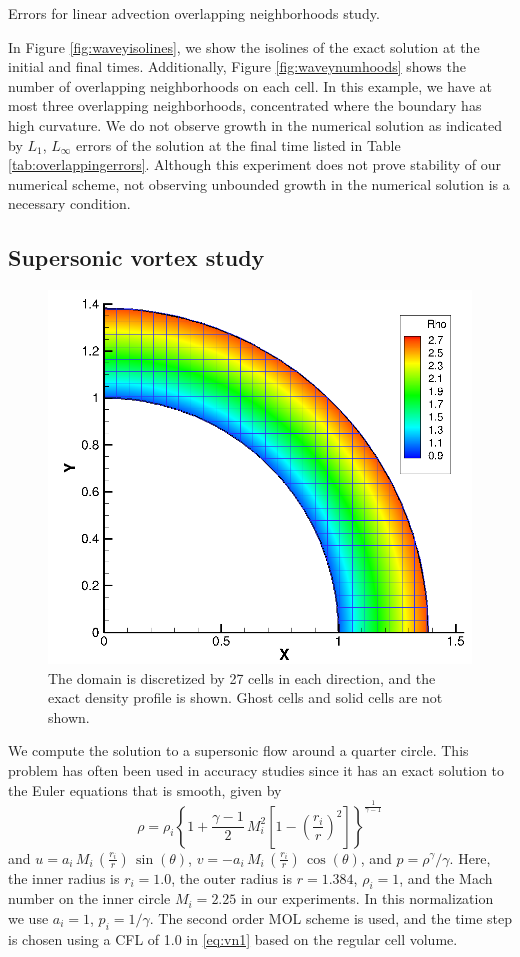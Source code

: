 {\begin{table}[h]
\caption{Errors for linear advection overlapping neighborhoods study.} \label{tab:overlappingerrors}
\end{table}

In Figure \ref{fig:waveyisolines}, we show the isolines of the exact solution 
at the initial and final times.  Additionally, Figure \ref{fig:waveynumhoods} 
shows the number of overlapping neighborhoods on each cell.  In this example, 
we have at most three overlapping neighborhoods,  concentrated where the 
boundary has high curvature.   We do not observe growth in the numerical 
solution as indicated by $L_1$, $L_\infty$ errors of the solution at the final 
time listed in Table \ref{tab:overlappingerrors}.  Although this experiment does 
not prove stability of our numerical scheme, not observing unbounded growth in the numerical solution is a necessary condition.
}

\subsection{Supersonic vortex study}\label{sec:ssv}

\begin{figure}
\centering
\vspace*{-.2in}
\includegraphics[height=0.45\textwidth]{figs/ssvIllustration.png}
\caption{\sf The domain is discretized by 27 cells in each direction, and
the exact density profile is shown. Ghost cells and solid cells are not shown.
\label{fig:ssvFig}}
\end{figure}

We compute the solution to a supersonic flow 
around a quarter circle.  This problem has often been used in accuracy 
studies \cite{aftosmis:acc} since it has an exact solution to the Euler
equations that is smooth, given by 
\begin{equation}
\rho = \rho_i \left \{ 1 + \frac{\gamma-1}{2} \, M_i^2 \left [ 1 - (\frac{r_i}{r})^2
\right ] \right \} ^
{\frac{1}{\gamma-1}}
\end{equation}
and $ u = a_i \, M_i \, (\frac{r_i}{r})\,  \sin (\theta)$, 
$ v = -a_i\,  M_i\,  (\frac{r_i}{r})\,  \cos(\theta)$, and
$ p = \rho^\gamma / \gamma$.
Here, the inner radius is $r_i = 1.0$,  the outer radius
is $r = 1.384$, $\rho_i=1$, and the Mach number on the inner circle
$M_i = 2.25$ in our experiments. 
In this
normalization we use $a_i = 1$, $p_i = 1/\gamma$. 
The second order MOL scheme is used, 
and the time step is chosen using a CFL of 1.0 in \eqref{eq:vn1}
based on the regular cell volume.

